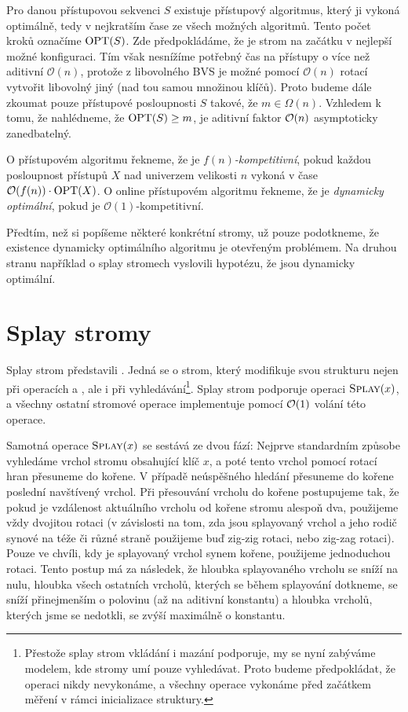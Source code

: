 Pro danou přístupovou sekvenci $S$ existuje přístupový algoritmus, který ji
vykoná optimálně, tedy v nejkratším čase ze všech možných algoritmů. Tento
počet kroků označíme $\operatorname{OPT}(S)$. Zde předpokládáme, že je strom na začátku v
nejlepší možné konfiguraci. Tím však nesnížíme potřebný čas na přístupy o více
než aditivní $\mathcal O(n)$, protože z libovolného BVS je možné pomocí
$\mathcal O(n)$ rotací vytvořit libovolný jiný (nad tou samou množinou klíčů).
Proto budeme dále zkoumat pouze přístupové posloupnosti $S$ takové, že $m \in
\Omega(n)$. Vzhledem k tomu, že nahlédneme, že $\operatorname{OPT}(S)\geq m$, je aditivní
faktor $\mathcal O(n)$ asymptoticky zanedbatelný. 


\begin{definice}
O přístupovém algoritmu řekneme, že je \emph{$f(n)$-kompetitivní}, pokud každou
posloupnost přístupů $X$ nad univerzem velikosti $n$ vykoná v čase $
\mathcal O(f(n))\cdot\operatorname{OPT}(X)$. O online přístupovém algoritmu řekneme, že je
\emph{dynamicky optimální}, pokud je $\mathcal O(1)$-kompetitivní.
\end{definice}

Předtím, než si popíšeme některé konkrétní stromy, už pouze podotkneme, že
existence dynamicky optimálního algoritmu je otevřeným problémem. Na druhou
stranu například o splay stromech vyslovili \citet{splay} hypotézu, že jsou
dynamicky optimální.

\section{Splay stromy}

Splay strom představili \citet{splay}. Jedná se o strom, který modifikuje svou strukturu nejen při operacích  a , ale i při vyhledávání\footnote{Přestože splay strom vkládání i mazání podporuje, my se nyní zabýváme modelem, kde stromy umí pouze vyhledávat. Proto budeme předpokládat, že operaci  nikdy nevykonáme, a všechny operace  vykonáme před začátkem měření v rámci inicializace struktury.}. Splay strom podporuje operaci $\ope{Splay}(x)$, a všechny ostatní stromové operace implementuje pomocí $\mathcal O(1)$ volání této operace.

Samotná operace $\ope{Splay}(x)$ se sestává ze dvou fází: Nejprve standardním způsobe
vyhledáme vrchol stromu obsahující klíč $x$, a poté tento vrchol pomocí rotací
hran přesuneme do kořene. V případě neúspěšného hledání přesuneme do kořene poslední navštívený vrchol. Při přesouvání vrcholu do kořene postupujeme tak, že
pokud je vzdálenost aktuálního vrcholu od kořene stromu alespoň dva, použijeme
vždy dvojitou rotaci (v závislosti na tom, zda jsou splayovaný vrchol a jeho
rodič synové na téže či různé straně použijeme buď zig-zig rotaci, nebo zig-zag
rotaci). Pouze ve chvíli, kdy je splayovaný vrchol synem kořene, použijeme
jednoduchou rotaci. Tento postup má za následek, že hloubka splayovaného vrcholu se sníží na nulu, hloubka všech ostatních vrcholů, kterých se během splayování dotkneme, se sníží přinejmenším o polovinu (až na aditivní konstantu) a hloubka vrcholů, kterých jsme se nedotkli, se zvýší maximálně o konstantu.

